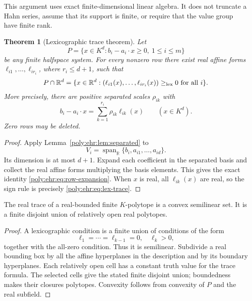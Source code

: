 \documentclass[11pt,a4paper]{article}
\numberwithin{equation}{section}
\newtheorem{theorem}{Theorem}[section]
\theoremstyle{plain}
\newcommand{\R}{\mathbb R}
\newcommand{\lexge}{\mathrel{\geq_{\rm lex}}}
\begin{document}
This argument uses exact finite-dimensional linear algebra. It does not
truncate a Hahn series, assume that its support is finite, or require that
the value group have finite rank.

\begin{theorem}[Lexicographic trace theorem]\label{poly:ehr:thm:lex}
Let
\[
 P=\{x\in K^d:b_i-a_i\cdot x\geq0,\ 1\leq i\leq m\}
\]
be any finite halfspace system. For every nonzero row there exist real affine
forms $\ell_{i1},\ldots,\ell_{ir_i}$, where $r_i\leq d+1$, such that
\begin{equation}\label{poly:ehr:eq:lex-trace}
 P\cap\R^d=
 \{x\in\R^d:(\ell_{i1}(x),\ldots,\ell_{ir_i}(x))\lexge0
                      \text{ for all }i\}.
\end{equation}
More precisely, there are positive separated scales $\rho_{ik}$ with
\begin{equation}\label{poly:ehr:eq:row-expansion}
 b_i-a_i\cdot x=\sum_{k=1}^{r_i}\rho_{ik}\ell_{ik}(x)
                    \qquad(x\in K^d).
\end{equation}
Zero rows may be deleted.
\end{theorem}
\begin{proof}
Apply Lemma~\ref{poly:ehr:lem:separated} to
\[
 V_i=\operatorname{span}_\R\{b_i,a_{i1},\ldots,a_{id}\}.
\]
Its dimension is at most $d+1$. Expand each coefficient in the separated
basis and collect the real affine forms multiplying the basis elements.
This gives the exact identity \eqref{poly:ehr:eq:row-expansion}. When $x$ is real,
all $\ell_{ik}(x)$ are real, so the sign rule is precisely
\eqref{poly:ehr:eq:lex-trace}.
\end{proof}

\begin{corollary}\label{poly:ehr:cor:semilinear}
The real trace of a real-bounded finite $K$-polytope is a convex semilinear
set. It is a finite disjoint union of relatively open real polytopes.
\end{corollary}
\begin{proof}
A lexicographic condition is a finite union of conditions of the form
\[
 \ell_1=\cdots=\ell_{k-1}=0,\quad\ell_k>0,
\]
together with the all-zero condition. Thus it is semilinear. Subdivide a real
bounding box by all the affine hyperplanes in the description and by its
boundary hyperplanes. Each relatively open cell has a constant truth value
for the trace formula. The selected cells give the stated finite disjoint
union; boundedness makes their closures polytopes. Convexity follows from
convexity of $P$ and the real subfield.
\end{proof}
\end{document}
